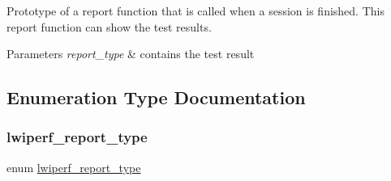 Prototype of a report function that is called when a session is finished. This report function can show the test results. 
\begin{DoxyParams}{Parameters}
{\em report\+\_\+type} & contains the test result \\
\hline
\end{DoxyParams}


\subsection{Enumeration Type Documentation}
\mbox{\label{openmote-cc2538_2lwip_2src_2include_2lwip_2apps_2lwiperf_8h_ab72a2d205e43d5243a291f937bbc24d6}} 
\subsubsection{\texorpdfstring{lwiperf\+\_\+report\+\_\+type}{lwiperf\_report\_type}}
{\footnotesize\ttfamily enum \hyperlink{native_2lwip_2src_2include_2lwip_2apps_2lwiperf_8h_ab72a2d205e43d5243a291f937bbc24d6}{lwiperf\+\_\+report\+\_\+type}}

